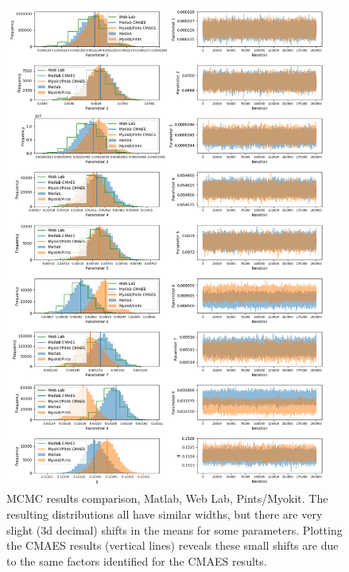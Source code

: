 \documentclass[preprint,authoryear,10pt]{elsarticle}
\begin{document}
\begin{figure}[H]
\centerline{
\includegraphics[width=0.95\textwidth]{fig/sine-wave-mcmc-trace}
}
\caption{%
MCMC results comparison, Matlab, Web Lab, Pints/Myokit.
The resulting distributions all have similar widths, but there are very slight
 (3d decimal) shifts in the means for some parameters.
Plotting the CMAES results (vertical lines) reveals these small shifts are due
 to the same factors identified for the CMAES results.
}
\label{fig:sine-wave-mcmc-trace}
\end{figure}
\end{document}
